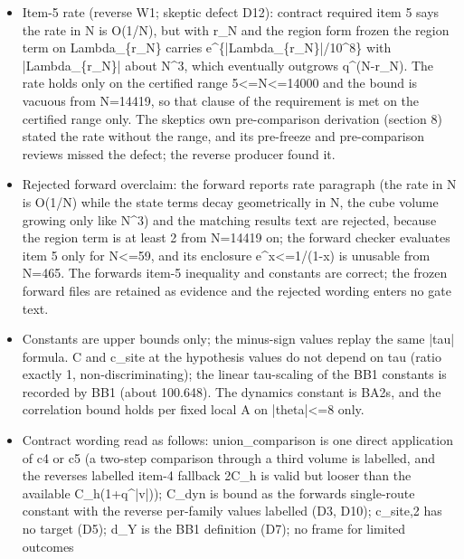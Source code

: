 \begin{gatequote}
\begin{itemize}
iterated\_split values discharge every item as well (labelled run). F2 volumes
other than centred cubes in c5 (item 4) rest on the AY1 itemization as a
reviewed local reading, not a gated statement.
\item Item-5 rate (reverse W1; skeptic defect D12): contract required item 5
says the rate in N is O(1/N), but with r\_N and the region form frozen the
region term on Lambda\_\{r\_N\} carries
e\textasciicircum{}\{|Lambda\_\{r\_N\}|/10\textasciicircum{}8\} with
|Lambda\_\{r\_N\}| about N\textasciicircum{}3, which eventually outgrows
q\textasciicircum{}(N-r\_N). The rate holds only on the certified range
5<=N<=14000 and the bound is vacuous from N=14419, so that clause of the
requirement is met on the certified range only. The skeptic\textquotesingle{}s
own pre-comparison derivation (section 8) stated the rate without the range,
and its pre-freeze and pre-comparison reviews missed the defect; the reverse
producer found it.
\item Rejected forward overclaim: the forward report\textquotesingle{}s rate
paragraph (the rate in N is O(1/N) while the state terms decay geometrically
in N, the cube volume growing only like N\textasciicircum{}3) and the matching
results text are rejected, because the region term is at least 2 from N=14419
on; the forward checker evaluates item 5 only for N<=59, and its enclosure
e\textasciicircum{}x<=1/(1-x) is unusable from N=465. The
forward\textquotesingle{}s item-5 inequality and constants are correct; the
frozen forward files are retained as evidence and the rejected wording enters
no gate text.
\item Constants are upper bounds only; the minus-sign values replay the same
|tau| formula. C\textquotesingle{} and c\textquotesingle{}\_site at the
hypothesis values do not depend on tau (ratio exactly 1, non-discriminating);
the linear tau-scaling of the BB1 constants is recorded by BB1 (about
100.648). The dynamics constant is BA2\textquotesingle{}s, and the correlation
bound holds per fixed local A on |theta|<=8 only.
\item Contract wording read as follows: union\_comparison is one direct
application of c4 or c5 (a two-step comparison through a third volume is
labelled, and the reverse\textquotesingle{}s labelled item-4 fallback 2C\_h is
valid but looser than the available C\_h(1+q\textasciicircum{}|v|)); C\_dyn is
bound as the forward\textquotesingle{}s single-route constant with the reverse
per-family values labelled (D3, D10); c\textquotesingle{}\_site,2 has no
target (D5); d\_Y is the BB1 definition (D7); no frame for limited outcomes

\end{itemize}
\end{gatequote}

